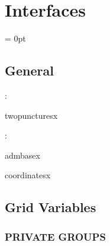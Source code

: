 
\section{Interfaces} 


\parskip = 0pt

\vspace{3mm} \subsection*{General}

: 

twopuncturesx
\vspace{2mm}

: 

admbasex

coordinatesx
\vspace{2mm}
\subsection*{Grid Variables}
\vspace{5mm}\subsubsection{PRIVATE GROUPS}

\vspace{5mm}

